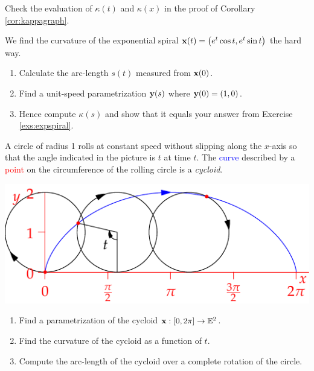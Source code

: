 \begin{exercises}
\begin{enumerate}
	\item Check the evaluation of $\kappa(t)$ and $\kappa(x)$ in the proof of Corollary \ref{cor:kappagraph}.

  \item We find the curvature of the exponential spiral ${\mathbf{x}}(t)=\bigl(e^t\cos t,e^t\sin t\bigr)$ the hard way.
  \begin{enumerate}
    \item Calculate the arc-length $s(t)$ measured from ${\mathbf{x}}(0)$.
    \item Find a unit-speed parametrization ${\mathbf{y}}(s)$ where ${\mathbf{y}}(0)=(1,0)$.
    \item Hence compute $\kappa(s)$ and show that it equals your answer from Exercise \ref{exs:expspiral}.%
  \end{enumerate}


	\begin{minipage}[t]{0.5\linewidth}\vspace{0pt}
		\item A circle of radius 1 rolls at constant speed without slipping along the $x$-axis so that the angle indicated in the picture is $t$ at time $t$.\smallbreak
		The \textcolor{blue}{curve} described by a \textcolor{red}{point} on the circumference of the rolling circle is a \emph{cycloid}.
	\end{minipage}\hfill\begin{minipage}[t]{0.49\linewidth}\vspace{0pt}
		\flushright\includegraphics[scale=0.85]{regular-cycloid}
	\end{minipage}

	\begin{enumerate}
		\item Find a parametrization of the cycloid ${\mathbf{x}}:[0,2\pi]\to\mathbb{E}^2$.
		\item Find the curvature of the cycloid as a function of $t$.
		\item Compute the arc-length of the cycloid over a complete rotation of the circle.
	\end{enumerate}
	

\end{enumerate}
\end{exercises}
